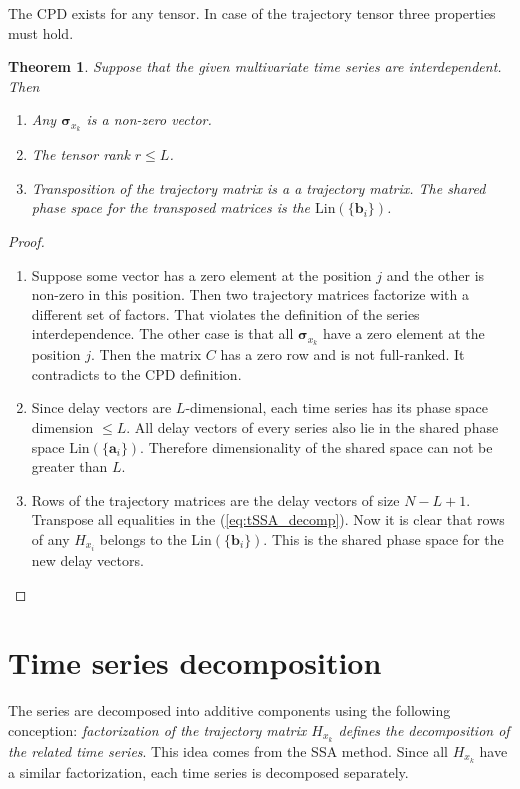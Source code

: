 \documentclass[referee, pdflatex, sn-mathphys-num]{sn-jnl}
\theoremstyle{definition}
\theoremstyle{plain}
\newtheorem{Th}{Theorem}
\begin{document}
	The CPD exists for any tensor. In case of the trajectory tensor three properties must hold.
	
	\begin{Th}
		Suppose that the given multivariate time series are interdependent. Then
		
		\begin{enumerate}
			\item Any $ \boldsymbol{\sigma}_{x_k} $ is a non-zero vector.
			\item The tensor rank $ r \le L $.
			\item Transposition of the trajectory matrix is a a trajectory matrix. The shared phase space for the transposed matrices is the $ \text{Lin}(\{\mathbf{b}_i\}) $.
		\end{enumerate}
	\end{Th}
	
	\begin{proof}
		\begin{enumerate}
			\item Suppose some vector has a zero element at the position $ j $ and the other is non-zero in this position. Then two trajectory matrices factorize with a different set of factors. That violates the definition of the series interdependence. The other case is that all $ \boldsymbol{\sigma}_{x_k} $ have a zero element at the position $ j $. Then the matrix $ C $ has a zero row and is not full-ranked. It contradicts to the CPD definition.
			\item Since delay vectors are $ L $-dimensional, each time series has its phase space dimension $ \le L $. All delay vectors of every series also lie in the shared phase space $ \text{Lin}(\{\mathbf{a}_i\}) $. Therefore dimensionality of the shared space can not be greater than $ L $.
			\item Rows of the trajectory matrices are the delay vectors of size $ N - L + 1 $. Transpose all equalities in the (\ref{eq:tSSA_decomp}). Now it is clear that rows of any $ H_{x_i} $ belongs to the $ \text{Lin}(\{\mathbf{b}_i\}) $. This is the shared phase space for the new delay vectors.
		\end{enumerate}
	\end{proof}

	\section{Time series decomposition}\label{sec:decomposition}
	
	The series are decomposed into additive components using the following conception: \emph{factorization of the trajectory matrix $ H_{x_k} $ defines the decomposition of the related time series}. This idea comes from the SSA method. Since all $ H_{x_k} $ have a similar factorization, each time series is decomposed separately.
	
\end{document}
